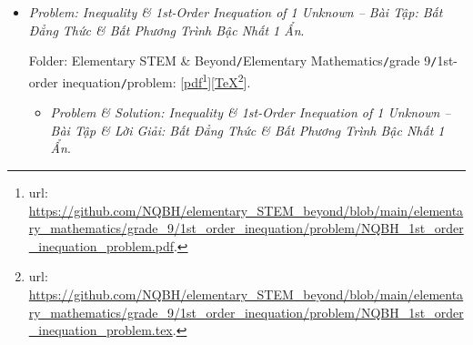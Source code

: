 \documentclass[12pt]{article}
\begin{document}
\begin{itemize}
\begin{itemize}
		Folder: {\sf Elementary STEM \& Beyond{\tt/}Elementary Mathematics{\tt/}grade 9{\tt/}system of 1st-order equations{\tt/}solution}: [\href{https://github.com/NQBH/elementary_STEM_beyond/blob/main/elementary_mathematics/grade_9/system_1st_order_equations/solution/NQBH_system_1st_order_equations_solution.pdf}{pdf}\footnote{{\sc url}: \url{https://github.com/NQBH/elementary_STEM_beyond/blob/main/elementary_mathematics/grade_9/system_1st_order_equations/solution/NQBH_system_1st_order_equations_solution.pdf}.}][\href{https://github.com/NQBH/elementary_STEM_beyond/blob/main/elementary_mathematics/grade_9/system_1st_order_equations/solution/NQBH_system_1st_order_equations_solution.tex}{\TeX}\footnote{{\sc url}: \url{https://github.com/NQBH/elementary_STEM_beyond/blob/main/elementary_mathematics/grade_9/system_1st_order_equations/solution/NQBH_system_1st_order_equations_solution.tex}.}].
	\end{itemize}
	\item {\it Problem: Inequality \& 1st-Order Inequation of 1 Unknown -- Bài Tập: Bất Đẳng Thức \& Bất Phương Trình Bậc Nhất 1 Ẩn}.
	
	Folder: {\sf Elementary STEM \& Beyond{\tt/}Elementary Mathematics{\tt/}grade 9{\tt/}1st-order inequation{\tt/}problem}: [\href{https://github.com/NQBH/elementary_STEM_beyond/blob/main/elementary_mathematics/grade_9/1st_order_inequation/problem/NQBH_1st_order_inequation_problem.pdf}{pdf}\footnote{{\sc url}: \url{https://github.com/NQBH/elementary_STEM_beyond/blob/main/elementary_mathematics/grade_9/1st_order_inequation/problem/NQBH_1st_order_inequation_problem.pdf}.}][\href{https://github.com/NQBH/elementary_STEM_beyond/blob/main/elementary_mathematics/grade_9/1st_order_inequation/problem/NQBH_1st_order_inequation_problem.tex}{\TeX}\footnote{{\sc url}: \url{https://github.com/NQBH/elementary_STEM_beyond/blob/main/elementary_mathematics/grade_9/1st_order_inequation/problem/NQBH_1st_order_inequation_problem.tex}.}].
	\begin{itemize}
		\item {\it Problem \& Solution: Inequality \& 1st-Order Inequation of 1 Unknown -- Bài Tập \& Lời Giải: Bất Đẳng Thức \& Bất Phương Trình Bậc Nhất 1 Ẩn}.
		

\end{itemize}
\end{itemize}
\end{document}
